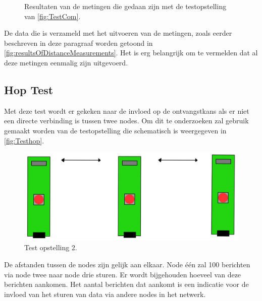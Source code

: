 \begin{figure}[ht]
    \centering
    \caption{Resultaten van de metingen die gedaan zijn met de testopstelling van \autoref{fig:TestCom}.}
    \label{fig:resultsOfDistanceMeasurements}
\end{figure}
De data die is verzameld met het uitvoeren van de metingen, zoals eerder beschreven in deze paragraaf worden getoond in \autoref{fig:resultsOfDistanceMeasurements}. Het is erg belangrijk om te vermelden dat al deze metingen eenmalig zijn uitgevoerd.

\subsection{Hop Test} \label{sec:influenceOfHopsInNetwork}
Met deze test wordt er gekeken naar de invloed op de ontvangstkans als er niet een directe verbinding is tussen twee nodes. Om dit te onderzoeken zal gebruik gemaakt worden van de testopstelling die schematisch is weergegeven in \autoref{fig:Testhop}. 
\begin{figure}[h]
    \centering
    \includegraphics[scale = 0.4]{img/test2.png}
    \caption{Test opstelling 2.}
    \label{fig:Testhop}
\end{figure}
De afstanden tussen de nodes zijn gelijk aan elkaar. Node één zal 100 berichten via node twee naar node drie sturen. Er wordt bijgehouden hoeveel van deze berichten aankomen. Het aantal berichten dat aankomt is een indicatie voor de invloed van het sturen van data via andere nodes in het netwerk.

